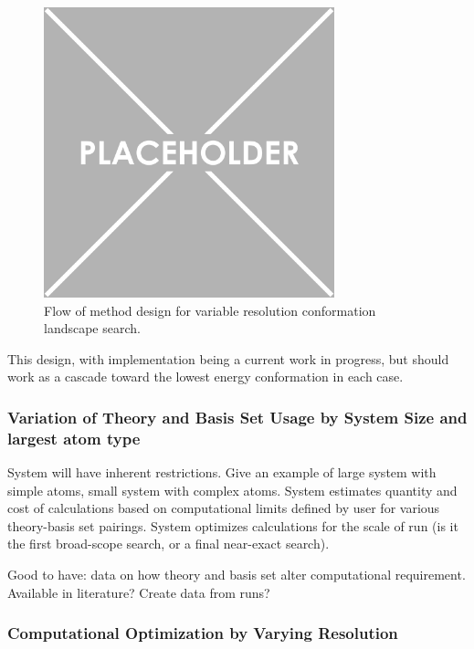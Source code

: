 \begin{figure}
	
	\centering
	
	\includegraphics[width=0.75\textwidth]{placeholder.png}
	
	\caption{Flow of method design for variable resolution conformation landscape search.}
	
	\label{fig:VRSDesign}
	
\end{figure}

This design, with implementation being a current work in progress, but should{\texttrademark} work as a cascade toward the lowest energy conformation in each case.

\subsubsection{Variation of Theory and Basis Set Usage by System Size and largest atom type}

System will have inherent restrictions. Give an example of large system with simple atoms, small system with complex atoms.
System estimates quantity and cost of calculations based on computational limits defined by user for various theory-basis set pairings. 
System optimizes calculations for the scale of run (is it the first broad-scope search, or a final near-exact search).

Good to have: data on how theory and basis set alter computational requirement. Available in literature? Create data from runs?

\subsubsection{Computational Optimization by Varying Resolution}

